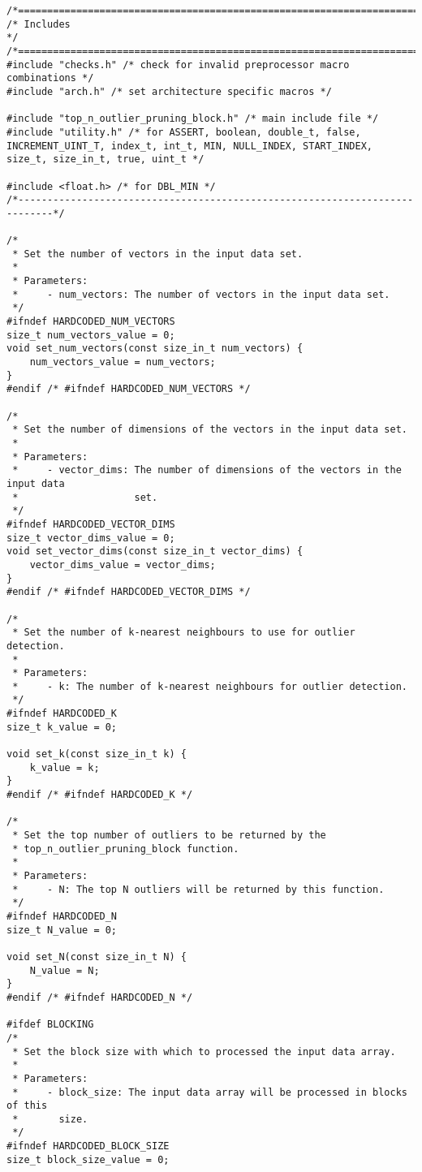 \lstset{language=C}
\begin{lstlisting}
/*============================================================================*/
/* Includes                                                                   */
/*============================================================================*/
#include "checks.h" /* check for invalid preprocessor macro combinations */
#include "arch.h" /* set architecture specific macros */

#include "top_n_outlier_pruning_block.h" /* main include file */
#include "utility.h" /* for ASSERT, boolean, double_t, false, INCREMENT_UINT_T, index_t, int_t, MIN, NULL_INDEX, START_INDEX, size_t, size_in_t, true, uint_t */

#include <float.h> /* for DBL_MIN */
/*----------------------------------------------------------------------------*/

/*
 * Set the number of vectors in the input data set.
 *
 * Parameters:
 *     - num_vectors: The number of vectors in the input data set.
 */
#ifndef HARDCODED_NUM_VECTORS
size_t num_vectors_value = 0;
void set_num_vectors(const size_in_t num_vectors) {
    num_vectors_value = num_vectors;
}
#endif /* #ifndef HARDCODED_NUM_VECTORS */

/*
 * Set the number of dimensions of the vectors in the input data set.
 *
 * Parameters:
 *     - vector_dims: The number of dimensions of the vectors in the input data 
 *                    set.
 */
#ifndef HARDCODED_VECTOR_DIMS
size_t vector_dims_value = 0;
void set_vector_dims(const size_in_t vector_dims) {
    vector_dims_value = vector_dims;
}
#endif /* #ifndef HARDCODED_VECTOR_DIMS */

/*
 * Set the number of k-nearest neighbours to use for outlier detection.
 *
 * Parameters:
 *     - k: The number of k-nearest neighbours for outlier detection.
 */
#ifndef HARDCODED_K
size_t k_value = 0;

void set_k(const size_in_t k) {
    k_value = k;
}
#endif /* #ifndef HARDCODED_K */

/*
 * Set the top number of outliers to be returned by the
 * top_n_outlier_pruning_block function.
 *
 * Parameters:
 *     - N: The top N outliers will be returned by this function.
 */
#ifndef HARDCODED_N
size_t N_value = 0;

void set_N(const size_in_t N) {
    N_value = N;
}
#endif /* #ifndef HARDCODED_N */

#ifdef BLOCKING
/*
 * Set the block size with which to processed the input data array.
 *
 * Parameters:
 *     - block_size: The input data array will be processed in blocks of this 
 *       size.
 */
#ifndef HARDCODED_BLOCK_SIZE
size_t block_size_value = 0;


\end{lstlisting}
